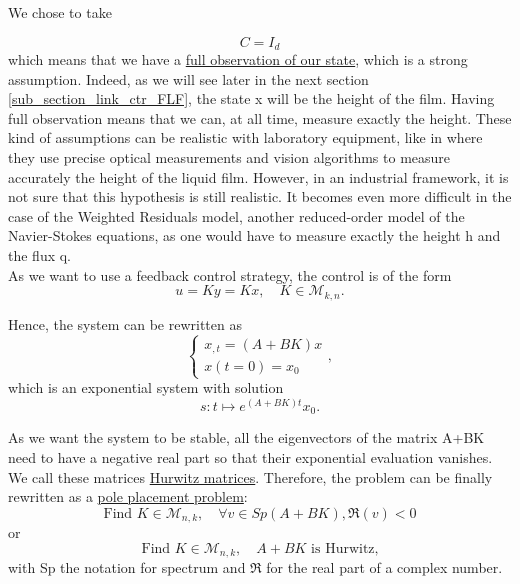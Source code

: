 \documentclass[12pt]{article}
\begin{document}
We chose to take 

\begin{equation}
    C = I_d
\end{equation}
which means that we have a \underline{ full observation of our state}, which is a strong assumption. Indeed, as we will 
see later in the next section \ref{sub_section_link_ctr_FLF}, the state x will be the height of the film. Having full 
observation means that we can, at all time, measure exactly the height. These kind of assumptions can be realistic with 
laboratory equipment, like in \cite{experimental_paper} where they use precise optical measurements and vision algorithms 
to measure accurately the height of the liquid film. However, in an industrial framework, it is not sure that this hypothesis
 is still realistic. It becomes even more difficult in the case of the Weighted Residuals model, another reduced-order model of 
 the Navier-Stokes equations, as one would have to measure exactly the height h and the flux q. 
\\

As we want to use a feedback control strategy, the control is of the form 
\begin{equation}
    u = Ky = Kx, \quad K \in \mathcal{M}_{k,n}.
\end{equation}

Hence, the system can be rewritten as 
\begin{equation}\label{expo_ctrl_system}
    \left\{
    \begin{aligned}
        x_{,t}=(A+BK)x \\
        x(t=0) = x_0
    \end{aligned}
    \right.,
\end{equation}
which is an exponential system with solution $$s:t\mapsto  e^{(A+BK)t}x_0.$$

As we want the system to be stable, all the eigenvectors of the matrix A+BK need to have a 
negative real part so that their exponential evaluation vanishes. We call these matrices \underline{Hurwitz matrices}. 
Therefore, the problem can be finally rewritten as a \underline{pole placement problem}: 
\begin{equation}\label{eq_pole_placement}
\boxed{
    \text{Find } K \in \mathcal{M}_{n,k},\quad \forall v \in Sp(A+BK), \mathfrak{R}(v) <0
    }
\end{equation}
or 
\begin{equation}\label{eq_pole_placement_Hurwitz}
    \text{Find } K \in \mathcal{M}_{n,k},\quad A+BK \text{ is Hurwitz,}
\end{equation}
with Sp the notation for spectrum and $\mathfrak{R}$ for the real part of a complex number.
\end{document}

